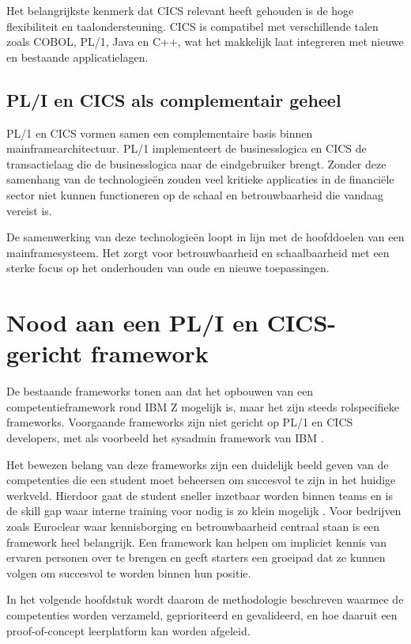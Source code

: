 Het belangrijkste kenmerk dat CICS relevant heeft gehouden is de hoge flexibiliteit en taalondersteuning.
CICS is compatibel met verschillende talen zoals COBOL, PL/1, Java en C++, wat het makkelijk laat integreren met nieuwe en bestaande applicatielagen.


\subsection{PL/I en CICS als complementair geheel}%
\label{sec:pli-cics-samen}

PL/1 en CICS vormen samen een complementaire basis binnen mainframearchitectuur.
PL/1 implementeert de businesslogica en CICS de transactielaag die de businesslogica naar de eindgebruiker brengt.
Zonder deze samenhang van de technologieën zouden veel kritieke applicaties in de financiële sector niet kunnen functioneren op de schaal en betrouwbaarheid die vandaag vereist is.

De samenwerking van deze technologieën loopt in lijn met de hoofddoelen van een mainframesysteem.
Het zorgt voor betrouwbaarheid en schaalbaarheid met een sterke focus op het onderhouden van oude en nieuwe toepassingen.


\section{Nood aan een PL/I en CICS-gericht framework}%
\label{sec:nood_framework}

De bestaande frameworks tonen aan dat het opbouwen van een competentieframework rond IBM Z mogelijk is,
maar het zijn steeds rolspecifieke frameworks.
Voorgaande frameworks zijn niet gericht op PL/1 en CICS developers, met als voorbeeld het sysadmin framework van IBM \autocite{ibm_app_dev_z_2023,ibm_z_sysadmin_level1,ibm_z_sysadmin_level2}.

Het bewezen belang van deze frameworks zijn een duidelijk beeld geven van de competenties die een student moet beheersen om succesvol te zijn in het huidige werkveld.
Hierdoor gaat de student sneller inzetbaar worden binnen teams en is de skill gap waar interne training voor nodig is zo klein mogelijk \autocite{Sharma2011TeachOrNotTeach,NgoYe2018TeachingMainframeSkills}.
Voor bedrijven zoals Euroclear waar kennisborging en betrouwbaarheid centraal staan is een framework heel belangrijk.
Een framework kan helpen om impliciet kennis van ervaren personen over te brengen en geeft starters een groeipad dat ze kunnen volgen om succesvol te worden binnen hun positie.


In het volgende hoofdstuk wordt daarom de methodologie beschreven waarmee de competenties worden verzameld, 
geprioriteerd en gevalideerd, en hoe daaruit een proof-of-concept leerplatform kan worden afgeleid.
